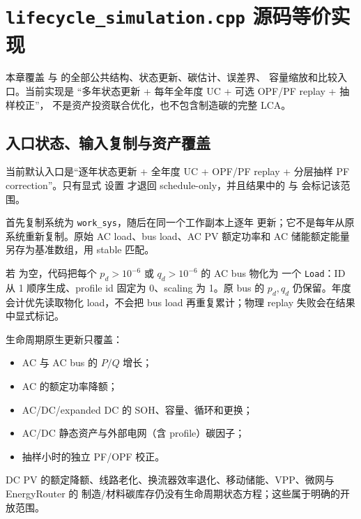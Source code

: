 \section{\texttt{lifecycle\_simulation.cpp} 源码等价实现}
\label{sec:lifecycle-source-equivalent}

本章覆盖
 与
 的全部公共结构、状态更新、碳估计、误差界、
容量缩放和比较入口。当前实现是 ``多年状态更新 + 每年全年度 UC + 可选 OPF/PF replay + 抽样校正''，
不是资产投资联合优化，也不包含制造碳的完整 LCA。

\subsection{入口状态、输入复制与资产覆盖}
当前默认入口是“逐年状态更新 + 全年度 UC + OPF/PF replay + 分层抽样 PF correction”。只有显式
设置  才退回 schedule-only，并且结果中的
 与  会标记该范围。

 首先复制系统为 \texttt{work\_sys}，随后在同一个工作副本上逐年
更新；它不是每年从原系统重新复制。原始 AC load、bus load、AC PV 额定功率和 AC 储能额定能量
另存为基准数组，用 stable  匹配。

若  为空，代码把每个 $p_d>10^{-6}$ 或 $q_d>10^{-6}$ 的 AC bus 物化为
一个 \texttt{Load}：ID 从 1 顺序生成、profile id 固定为 0、scaling 为 1。原 bus 的 $p_d,q_d$
仍保留。年度会计优先读取物化 load，不会把 bus load 再重复累计；物理 replay 失败会在结果中显式标记。

生命周期原生更新只覆盖：
\begin{itemize}
  \item AC  与 AC bus 的 $P/Q$ 增长；
  \item AC  的额定功率降额；
  \item AC/DC/expanded DC  的 SOH、容量、循环和更换；
  \item AC/DC 静态资产与外部电网（含 profile）碳因子；
  \item 抽样小时的独立 PF/OPF 校正。
\end{itemize}
DC PV 的额定降额、线路老化、换流器效率退化、移动储能、VPP、微网与 EnergyRouter 的
制造/材料碳库存仍没有生命周期状态方程；这些属于明确的开放范围。

